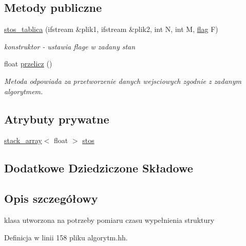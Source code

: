 \subsection*{Metody publiczne}
\begin{DoxyCompactItemize}
\item 
\hyperlink{classstos__tablica_a74b6909e896922fd4ebb355e1e996523}{stos\-\_\-tablica} (ifstream \&plik1, ifstream \&plik2, int N, int M, \hyperlink{stos_8hh_a7847560c748814fd3070e9149a9578bd}{flag} F)
\begin{DoxyCompactList}\small\item\em konstruktor -\/ ustawia flage w zadany stan \end{DoxyCompactList}\item 
float \hyperlink{classstos__tablica_a44ec89c9723d4034e46ae3b51b01faea}{przelicz} ()
\begin{DoxyCompactList}\small\item\em Metoda odpowiada za przetworzenie danych wejsciowych zgodnie z zadanym algorytmem. \end{DoxyCompactList}\end{DoxyCompactItemize}
\subsection*{Atrybuty prywatne}
\begin{DoxyCompactItemize}
\item 
\hyperlink{classstack__array}{stack\-\_\-array}$<$ float $>$ \hyperlink{classstos__tablica_a8aa72aa52bd2436cb12d9e1c8e077389}{stos}
\end{DoxyCompactItemize}
\subsection*{Dodatkowe Dziedziczone Składowe}


\subsection{Opis szczegółowy}
klasa utworzona na potrzeby pomiaru czasu wypełnienia struktury 

Definicja w linii 158 pliku algorytm.\-hh.



